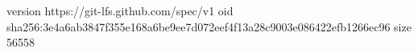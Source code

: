 version https://git-lfs.github.com/spec/v1
oid sha256:3e4a6ab3847f355e168a6be9ee7d072eef4f13a28c9003e086422efb1266ec96
size 56558
